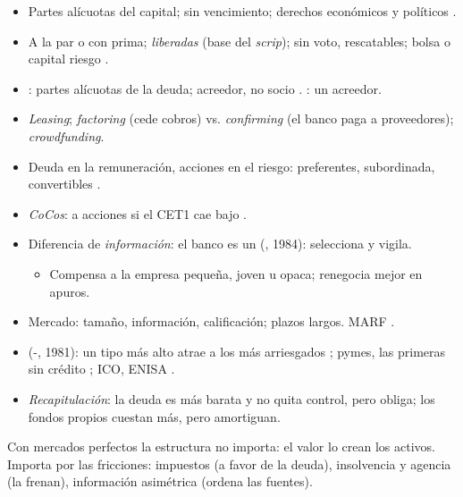 \documentclass{article}
\begin{document}
\begin{columnas}
\begin{itemize}
\item Partes alícuotas del capital; sin vencimiento; derechos económicos y políticos .
\item A la par o con prima; \emph{liberadas} (base del \emph{scrip}); sin voto, rescatables; bolsa o capital riesgo .
\end{itemize}
\begin{itemize}
\item {}: partes alícuotas de la deuda; acreedor, no socio . : un acreedor.
\item \emph{Leasing}; \emph{factoring} (cede cobros) vs. \emph{confirming} (el banco paga a proveedores); \emph{crowdfunding}.
\end{itemize}
\begin{itemize}
\item Deuda en la remuneración, acciones en el riesgo: preferentes, subordinada, convertibles .
\item \emph{CoCos}: a acciones si el CET1 cae bajo  .
\end{itemize}
\begin{itemize}
\item Diferencia de \emph{información}: el banco es un  (, 1984): selecciona y vigila.
  \begin{itemize}
  \item Compensa a la empresa pequeña, joven u opaca; renegocia mejor en apuros.
  \end{itemize}
\item Mercado: tamaño, información, calificación; plazos largos. MARF .
\item {} (-, 1981): un tipo más alto atrae a los más arriesgados ; pymes, las primeras sin crédito ; ICO, ENISA .
\item \emph{Recapitulación}: la deuda es más barata y no quita control, pero obliga; los fondos propios cuestan más, pero amortiguan.
\end{itemize}

\begin{ideaclave}
Con mercados perfectos la estructura no importa: el valor lo crean los activos. Importa por las fricciones: impuestos (a favor de la deuda), insolvencia y agencia (la frenan), información asimétrica (ordena las fuentes).
\end{ideaclave}


\end{columnas}
\end{document}
